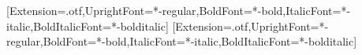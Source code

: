 \usepackage{cite}
\usepackage{amsmath}
\usepackage{fontspec}
\usepackage{unicode-math}
\setmainfont{texgyretermes}[Extension=.otf,UprightFont=*-regular,BoldFont=*-bold,ItalicFont=*-italic,BoldItalicFont=*-bolditalic]
\setmonofont{texgyrecursor}[Extension=.otf,UprightFont=*-regular,BoldFont=*-bold,ItalicFont=*-italic,BoldItalicFont=*-bolditalic]
\usepackage{algorithm}
\usepackage{algpseudocode}
\usepackage{graphicx}
\usepackage{booktabs}
\usepackage{tabularx}
\usepackage{array}
\usepackage[table]{xcolor}
\usepackage{url}
\usepackage[hidelinks]{hyperref}
\newcommand{\writebox}[1]{\par\smallskip\noindent\fcolorbox{orange}{yellow!18}{\parbox{\dimexpr\linewidth-2\fboxsep-2\fboxrule}{\footnotesize\textbf{[TO WRITE IN OWN WORDS]} #1}}\par\smallskip}

